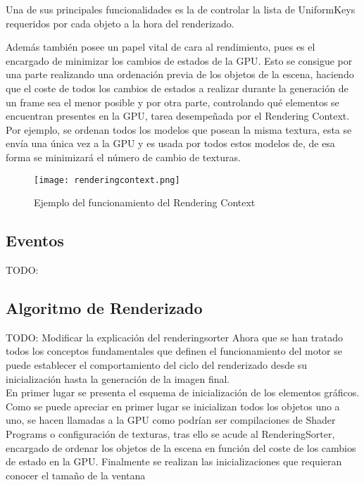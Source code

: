 Una de sus principales funcionalidades es la de controlar la lista de UniformKeys requeridos por cada objeto a la hora del renderizado.

Además también posee un papel vital de cara al rendimiento, pues es el encargado de minimizar los cambios de estados de la GPU. Esto se consigue por una parte realizando una ordenación previa de los objetos de la escena, haciendo que el coste de todos los cambios de estados a realizar durante la generación de un frame sea el menor posible y por otra parte, controlando qué elementos se encuentran presentes en la GPU, tarea desempeñada por el Rendering Context.\\

Por ejemplo, se ordenan todos los modelos que posean la misma textura, esta se envía una única vez a la GPU y es usada por todos estos modelos de, de esa forma se minimizará el número de cambio de texturas.\\

\begin{figure}[h!]
\begin{center}
\texttt{[image: renderingcontext.png]}
\end{center}
\caption[Ejemplo del funcionamiento del Rendering Context]{Ejemplo del funcionamiento del Rendering Context}
\label{fig:renderingcontext}
\end{figure}

\subsection{Eventos}
TODO:

\subsection{Algoritmo de Renderizado}
TODO: Modificar la explicación del renderingsorter
Ahora que se han tratado todos los conceptos fundamentales que definen el funcionamiento del motor se puede establecer el comportamiento del ciclo del renderizado desde su inicialización hasta la generación de la imagen final.\\

En primer lugar se presenta el esquema de inicialización de los elementos gráficos.\\
Como se puede apreciar en primer lugar se inicializan todos los objetos uno a uno, se hacen llamadas a la GPU como podrían ser compilaciones de Shader Programs o configuración de texturas,
tras ello se acude al RenderingSorter, encargado de ordenar los objetos de la escena en función del coste de los cambios de estado en la GPU.
Finalmente se realizan las inicializaciones que requieran conocer el tamaño de la ventana 

